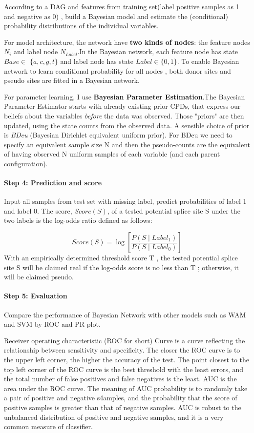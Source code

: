 \documentclass{gapd}
\begin{document}
According to a DAG and features from training set(label positive samples
as 1 and negative as 0) , build a Bayesian model and estimate the
(conditional) probability distributions of the individual variables.

For model architecture, the network have \textbf{two kinds of nodes}:
the feature nodes \(N_i\) and label node \(N_{Label}\).In the Bayesian
network, each feature node has state \({Base} \in\) \(\{a, c, g, t\}\)
and label node has state \({Label} \in\{0,1\}\). To enable Bayesian
network to learn conditional probability for all nodes , both donor
sites and pseudo sites are fitted in a Bayesian network.

For parameter learning, I use \textbf{Bayesian Parameter Estimation}.The
Bayesian Parameter Estimator starts with already existing prior CPDs,
that express our beliefs about the variables \emph{before} the data was
observed. Those "priors" are then updated, using the state counts from
the observed data. A sensible choice of prior is \emph{BDeu} (Bayesian
Dirichlet equivalent uniform prior). For BDeu we need to specify an
equivalent sample size N and then the pseudo-counts are the equivalent
of having observed N uniform samples of each variable (and each parent
configuration).

\paragraph{Step 4: Prediction and score}\label{prediction-and-score}

Input all samples from test set with missing label, predict
probabilities of label 1 and label 0. The score, \(Score(S)\), of a
tested potential splice site S under the two labels is the log-odds
ratio defined as follows:

\[Score(S)=\log \left[\frac{P\left(S \mid Label_{\mathrm{1}}\right)}{P\left(S \mid Label_{\mathrm{0}}\right)}\right]\]
With an empirically determined threshold score T , the tested potential
splice site S will be claimed real if the log-odds score is no less than
T ; otherwise, it will be claimed pseudo.

\paragraph{Step 5: Evaluation}\label{evaluation}

Compare the performance of Bayesian Network with other models such as
WAM and SVM by ROC and PR plot.

Receiver operating characteristic (ROC for short) Curve is a curve
reflecting the relationship between sensitivity and specificity. The
closer the ROC curve is to the upper left corner, the higher the
accuracy of the test. The point closest to the top left corner of the
ROC curve is the best threshold with the least errors, and the total
number of false positives and false negatives is the least. AUC is the
area under the ROC curve. The meaning of AUC probability is to randomly
take a pair of positive and negative s4amples, and the probability that
the score of positive samples is greater than that of negative samples.
AUC is robust to the unbalanced distribution of positive and negative
samples, and it is a very common measure of classifier.
\end{document}
